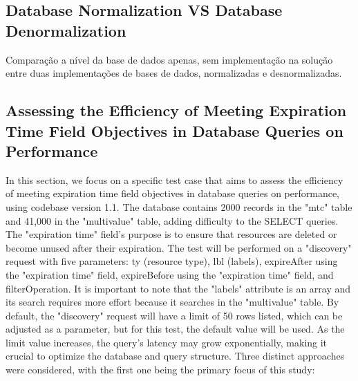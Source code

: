 \documentclass[a4paper,fleqn]{cas-dc}
\begin{document}
\subsection{Database Normalization VS Database Denormalization} \label{sec:normalizationvsdenormalization}

Comparação a nível da base de dados apenas, sem implementação na solução entre duas implementações de bases de dados, normalizadas e desnormalizadas.

\subsection{Assessing the Efficiency of Meeting Expiration Time Field Objectives in Database Queries on Performance}

In this section, we focus on a specific test case that aims to assess the efficiency of meeting expiration time field objectives in database queries on performance, using codebase version 1.1. The database contains 2000 records in the "mtc" table and 41,000 in the "multivalue" table, adding difficulty to the SELECT queries. The "expiration time" field's purpose is to ensure that resources are deleted or become unused after their expiration. The test will be performed on a "discovery" request with five parameters: ty (resource type), lbl (labels), expireAfter using the "expiration time" field, expireBefore using the "expiration time" field, and filterOperation. It is important to note that the "labels" attribute is an array and its search requires more effort because it searches in the "multivalue" table. By default, the "discovery" request will have a limit of 50 rows listed, which can be adjusted as a parameter, but for this test, the default value will be used. As the limit value increases, the query's latency may grow exponentially, making it crucial to optimize the database and query structure. Three distinct approaches were considered, with the first one being the primary focus of this study:
\end{document}
